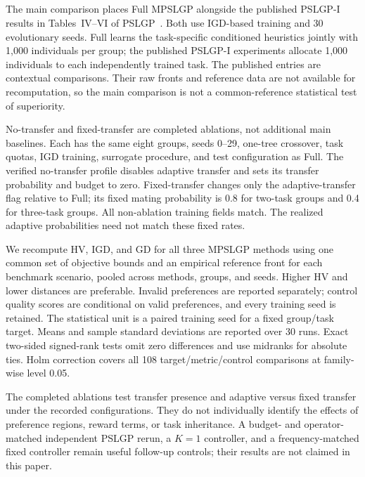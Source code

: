 \subsection{}
\begingroup
\color{resultrevision}
The main comparison places Full MPSLGP alongside the published PSLGP-I results in Tables~IV--VI of PSLGP~\cite{xu2026pslgp}. Both use IGD-based training and 30 evolutionary seeds. Full learns the task-specific conditioned heuristics jointly with 1,000 individuals per group; the published PSLGP-I experiments allocate 1,000 individuals to each independently trained task. The published entries are contextual comparisons. Their raw fronts and reference data are not available for recomputation, so the main comparison is not a common-reference statistical test of superiority.

No-transfer and fixed-transfer are completed ablations, not additional main baselines. Each has the same eight groups, seeds 0--29, one-tree crossover, task quotas, IGD training, surrogate procedure, and test configuration as Full. The verified no-transfer profile disables adaptive transfer and sets its transfer probability and budget to zero. Fixed-transfer changes only the adaptive-transfer flag relative to Full; its fixed mating probability is 0.8 for two-task groups and 0.4 for three-task groups. All non-ablation training fields match. The realized adaptive probabilities need not match these fixed rates.

We recompute HV, IGD, and GD for all three MPSLGP methods using one common set of objective bounds and an empirical reference front for each benchmark scenario, pooled across methods, groups, and seeds. Higher HV and lower distances are preferable. Invalid preferences are reported separately; control quality scores are conditional on valid preferences, and every training seed is retained. The statistical unit is a paired training seed for a fixed group/task target. Means and sample standard deviations are reported over 30 runs. Exact two-sided signed-rank tests omit zero differences and use midranks for absolute ties. Holm correction covers all 108 target/metric/control comparisons at family-wise level 0.05.

The completed ablations test transfer presence and adaptive versus fixed transfer under the recorded configurations. They do not individually identify the effects of preference regions, reward terms, or task inheritance. A budget- and operator-matched independent PSLGP rerun, a $K=1$ controller, and a frequency-matched fixed controller remain useful follow-up controls; their results are not claimed in this paper.
\endgroup